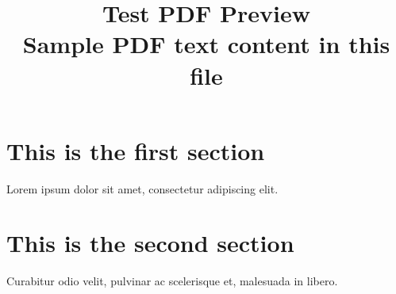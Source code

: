 \documentclass[a4paper]{article}
\begin{document}
\title{\huge Test PDF Preview \\ \large Sample PDF text content in this file}
\maketitle

\large

\section{This is the first section}

Lorem ipsum dolor sit amet, consectetur adipiscing elit.

\section{This is the second section}

Curabitur odio velit, pulvinar ac scelerisque et, malesuada in libero.

\end{document}
